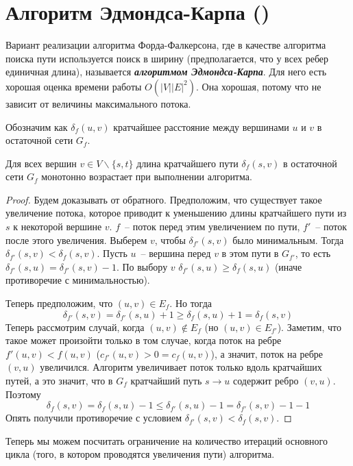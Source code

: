 \let\bf\bfseries
\let\it\itshape
\section{Алгоритм Эдмондса-Карпа (\groth)}\label{edmonds_karp}
Вариант реализации алгоритма Форда-Фалкерсона, где в качестве алгоритма поиска пути используется поиск в ширину (предполагается, что у всех ребер единичная длина), называется {\bf\it алгоритмом Эдмондса-Карпа}. Для него есть хорошая оценка времени работы $O(|V||E|^2)$. Она хорошая, потому что не зависит от величины максимального потока.

Обозначим как $\delta_f(u,v)$ кратчайшее расстояние между вершинами $u$ и $v$ в остаточной сети $G_f$.
\begin{lemma}\label{someshit5}
	Для всех вершин $v\in V\smallsetminus\{s,t\}$ длина кратчайшего пути $\delta_f(s,v)$ в остаточной сети $G_f$ монотонно возрастает при выполнении алгоритма.
\end{lemma}
\begin{proof}
	Будем доказывать от обратного. Предположим, что существует такое увеличение потока, которое приводит к уменьшению длины кратчайшего пути из $s$ к некоторой вершине $v$. $f$~-- поток перед этим увеличением по пути, $f'$~-- поток после этого увеличения. Выберем $v$, чтобы $\delta_{f'}(s,v)$ было минимальным. Тогда $\delta_{f'}(s,v)<\delta_f(s,v)$. Пусть $u$~-- вершина перед $v$ в этом пути в $G_{f'}$, то есть $\delta_{f'}(s,u)=\delta_{f'}(s,v)-1$. По выбору $v$ $\delta_{f'}(s,u)\ge\delta_f(s,u)$ (иначе противоречие с минимальностью).

	Теперь предположим, что $(u,v)\in E_f$. Но тогда $$\delta_{f'}(s,v)=\delta_{f'}(s,u)+1\ge\delta_f(s,u)+1=\delta_f(s,v)$$
	Теперь рассмотрим случай, когда $(u,v)\not\in E_f$ (но $(u,v)\in E_{f'}$). Заметим, что такое может произойти только в том случае, когда поток на ребре $f'(u,v)<f(u,v)$ ($c_{f'}(u,v)>0=c_f(u,v)$), а значит, поток на ребре $(v,u)$ увеличился. Алгоритм увеличивает поток только вдоль кратчайших путей, а это значит, что в $G_f$ кратчайший путь $s\to u$ содержит ребро $(v,u)$. Поэтому $$\delta_f(s,v)=\delta_f(s,u)-1\le\delta_{f'}(s,u)-1=\delta_{f'}(s,v)-1-1$$
	Опять получили противоречие с условием $\delta_{f'}(s,v)<\delta_f(s,v)$.
\end{proof}

Теперь мы можем посчитать ограничение на количество итераций основного цикла (того, в котором проводятся увеличения пути) алгоритма.

